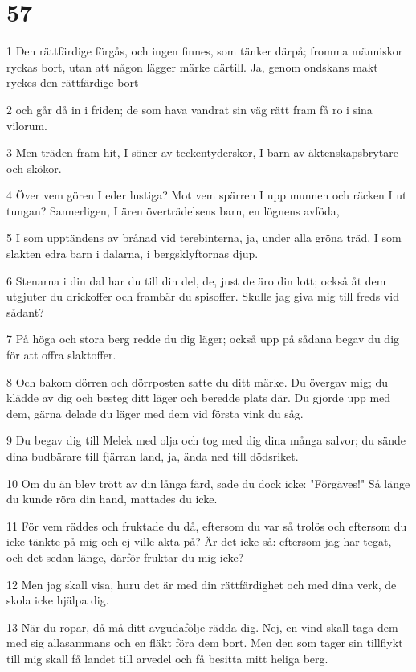 \chapter{57}

\par 1 Den rättfärdige förgås, och ingen finnes, som tänker därpå; fromma människor ryckas bort, utan att någon lägger märke därtill. Ja, genom ondskans makt ryckes den rättfärdige bort
\par 2 och går då in i friden; de som hava vandrat sin väg rätt fram få ro i sina vilorum.
\par 3 Men träden fram hit, I söner av teckentyderskor, I barn av äktenskapsbrytare och skökor.
\par 4 Över vem gören I eder lustiga? Mot vem spärren I upp munnen och räcken I ut tungan? Sannerligen, I ären överträdelsens barn, en lögnens avföda,
\par 5 I som upptändens av brånad vid terebinterna, ja, under alla gröna träd, I som slakten edra barn i dalarna, i bergsklyftornas djup.
\par 6 Stenarna i din dal har du till din del, de, just de äro din lott; också åt dem utgjuter du drickoffer och frambär du spisoffer. Skulle jag giva mig till freds vid sådant?
\par 7 På höga och stora berg redde du dig läger; också upp på sådana begav du dig för att offra slaktoffer.
\par 8 Och bakom dörren och dörrposten satte du ditt märke. Du övergav mig; du klädde av dig och besteg ditt läger och beredde plats där. Du gjorde upp med dem, gärna delade du läger med dem vid första vink du såg.
\par 9 Du begav dig till Melek med olja och tog med dig dina många salvor; du sände dina budbärare till fjärran land, ja, ända ned till dödsriket.
\par 10 Om du än blev trött av din långa färd, sade du dock icke: "Förgäves!" Så länge du kunde röra din hand, mattades du icke.
\par 11 För vem räddes och fruktade du då, eftersom du var så trolös och eftersom du icke tänkte på mig och ej ville akta på? Är det icke så: eftersom jag har tegat, och det sedan länge, därför fruktar du mig icke?
\par 12 Men jag skall visa, huru det är med din rättfärdighet och med dina verk, de skola icke hjälpa dig.
\par 13 När du ropar, då må ditt avgudafölje rädda dig. Nej, en vind skall taga dem med sig allasammans och en fläkt föra dem bort. Men den som tager sin tillflykt till mig skall få landet till arvedel och få besitta mitt heliga berg.
